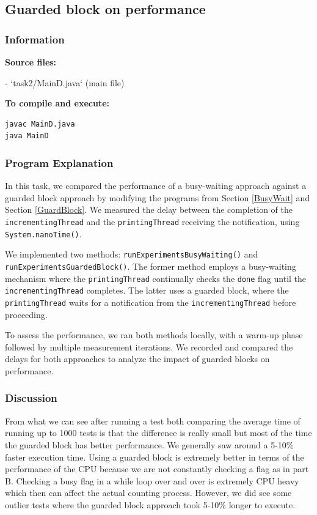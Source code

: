 \documentclass{article}
\begin{document}
\subsection{Guarded block on performance}

\subsubsection{Information}
\textbf{Source files:}

- `task2/MainD.java` (main file)

\textbf{To compile and execute:}
\begin{lstlisting}[style=bash]
javac MainD.java
java MainD
\end{lstlisting}

\subsubsection{Program Explanation}
In this task, we compared the performance of a busy-waiting approach against a guarded block approach by modifying the programs from Section \ref{BusyWait} and Section \ref{GuardBlock}. We measured the delay between the completion of the \texttt{incrementingThread} and the \texttt{printingThread} receiving the notification, using \texttt{System.nanoTime()}.

We implemented two methods: \texttt{runExperimentsBusyWaiting()} and \\ \texttt{runExperimentsGuardedBlock()}. The former method employs a busy-waiting mechanism where the \texttt{printingThread} continually checks the \texttt{done} flag until the \texttt{incrementingThread} completes. The latter uses a guarded block, where the \texttt{printingThread} waits for a notification from the \texttt{incrementingThread} before proceeding.

To assess the performance, we ran both methods locally, with a warm-up phase followed by multiple measurement iterations. We recorded and compared the delays for both approaches to analyze the impact of guarded blocks on performance.

\subsubsection{Discussion}
From what we can see after running a test both comparing the average time of running up to 1000 tests is that the difference is really small but most of the time the guarded block has better performance. We generally saw around a 5-10\% faster execution time. Using a guarded block is extremely better in terms of the performance of the CPU because we are not constantly checking a flag as in part B. Checking a busy flag in a while loop over and over is extremely CPU heavy which then can affect the actual counting process. However, we did see some outlier tests where the guarded block approach took 5-10\% longer to execute.
\end{document}
